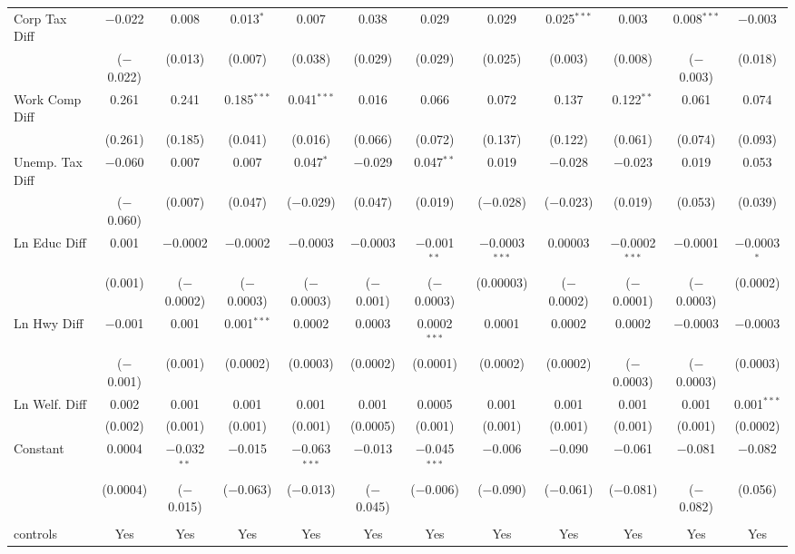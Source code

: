 \begin{table}[!htbp]
\begin{tabular}{@{\extracolsep{5pt}}lccccccccccc}
  Corp Tax Diff & $-$0.022 & 0.008 & 0.013$^{*}$ & 0.007 & 0.038 & 0.029 & 0.029 & 0.025$^{***}$ & 0.003 & 0.008$^{***}$ & $-$0.003 \\ 
  & ($-$0.022) & (0.013) & (0.007) & (0.038) & (0.029) & (0.029) & (0.025) & (0.003) & (0.008) & ($-$0.003) & (0.018) \\ 
  Work Comp Diff & 0.261 & 0.241 & 0.185$^{***}$ & 0.041$^{***}$ & 0.016 & 0.066 & 0.072 & 0.137 & 0.122$^{**}$ & 0.061 & 0.074 \\ 
  & (0.261) & (0.185) & (0.041) & (0.016) & (0.066) & (0.072) & (0.137) & (0.122) & (0.061) & (0.074) & (0.093) \\ 
  Unemp. Tax Diff & $-$0.060 & 0.007 & 0.007 & 0.047$^{*}$ & $-$0.029 & 0.047$^{**}$ & 0.019 & $-$0.028 & $-$0.023 & 0.019 & 0.053 \\ 
  & ($-$0.060) & (0.007) & (0.047) & ($-$0.029) & (0.047) & (0.019) & ($-$0.028) & ($-$0.023) & (0.019) & (0.053) & (0.039) \\ 
  Ln Educ Diff & 0.001 & $-$0.0002 & $-$0.0002 & $-$0.0003 & $-$0.0003 & $-$0.001$^{**}$ & $-$0.0003$^{***}$ & 0.00003 & $-$0.0002$^{***}$ & $-$0.0001 & $-$0.0003$^{*}$ \\ 
  & (0.001) & ($-$0.0002) & ($-$0.0003) & ($-$0.0003) & ($-$0.001) & ($-$0.0003) & (0.00003) & ($-$0.0002) & ($-$0.0001) & ($-$0.0003) & (0.0002) \\ 
  Ln Hwy Diff & $-$0.001 & 0.001 & 0.001$^{***}$ & 0.0002 & 0.0003 & 0.0002$^{***}$ & 0.0001 & 0.0002 & 0.0002 & $-$0.0003 & $-$0.0003 \\ 
  & ($-$0.001) & (0.001) & (0.0002) & (0.0003) & (0.0002) & (0.0001) & (0.0002) & (0.0002) & ($-$0.0003) & ($-$0.0003) & (0.0003) \\ 
  Ln Welf. Diff & 0.002 & 0.001 & 0.001 & 0.001 & 0.001 & 0.0005 & 0.001 & 0.001 & 0.001 & 0.001 & 0.001$^{***}$ \\ 
  & (0.002) & (0.001) & (0.001) & (0.001) & (0.0005) & (0.001) & (0.001) & (0.001) & (0.001) & (0.001) & (0.0002) \\ 
  Constant & 0.0004 & $-$0.032$^{**}$ & $-$0.015 & $-$0.063$^{***}$ & $-$0.013 & $-$0.045$^{***}$ & $-$0.006 & $-$0.090 & $-$0.061 & $-$0.081 & $-$0.082 \\ 
  & (0.0004) & ($-$0.015) & ($-$0.063) & ($-$0.013) & ($-$0.045) & ($-$0.006) & ($-$0.090) & ($-$0.061) & ($-$0.081) & ($-$0.082) & (0.056) \\ 
 \hline \\[-1.8ex] 
controls & Yes & Yes & Yes & Yes & Yes & Yes & Yes & Yes & Yes & Yes & Yes \\ 

\end{tabular}
\end{table}
